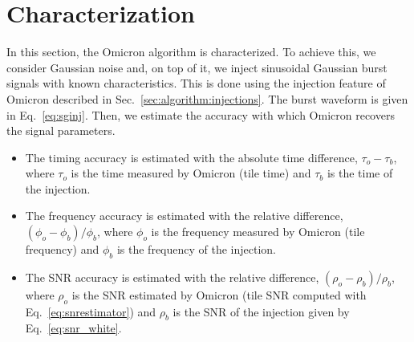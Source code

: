 \section{Characterization} \label{sec:characterization}

In this section, the Omicron algorithm is characterized. To achieve this, we consider Gaussian noise and, on top of it, we inject sinusoidal Gaussian burst signals with known characteristics. This is done using the injection feature of Omicron described in Sec.~\ref{sec:algorithm:injections}. The burst waveform is given in Eq.~\ref{eq:sginj}. Then, we estimate the accuracy with which Omicron recovers the signal parameters.
\begin{itemize}
\item The timing accuracy is estimated with the absolute time difference, $\tau_o-\tau_b$, where $\tau_o$ is the time measured by Omicron (tile time) and $\tau_b$ is the time of the injection.
\item The frequency accuracy is estimated with the relative difference, $(\phi_o-\phi_b)/\phi_b$, where $\phi_o$ is the frequency measured by Omicron (tile frequency) and $\phi_b$ is the frequency of the injection.
\item The SNR accuracy is estimated with the relative difference, $(\rho_o-\rho_b)/\rho_b$, where $\rho_o$ is the SNR estimated by Omicron (tile SNR computed with Eq.~\ref{eq:snrestimator}) and $\rho_b$ is the SNR of the injection given by Eq.~\ref{eq:snr_white}.
\end{itemize}



